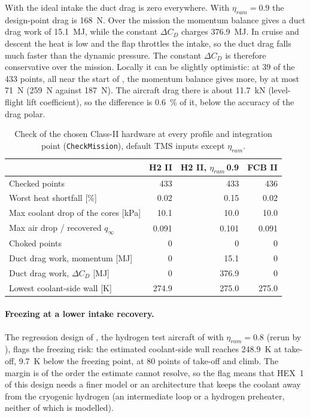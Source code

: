\documentclass[a4paper,11pt]{article}
\begin{document}
With the ideal intake the duct drag is zero everywhere. With $\eta_{ram} = 0.9$ the
design-point drag is \SI{168}{N}. Over the mission the momentum balance gives a duct drag
work of \SI{15.1}{MJ}, while the constant $\Delta C_D$ charges \SI{376.9}{MJ}. In cruise and
descent the heat is low and the flap throttles the intake, so the duct drag falls much faster
than the dynamic pressure. The constant $\Delta C_D$ is therefore conservative over the
mission. Locally it can be slightly optimistic: at 39 of the 433 points, all near the start
of , the momentum balance gives more, by at most \SI{71}{N}
(\SI{259}{N} against \SI{187}{N}). The aircraft drag there is about \SI{11.7}{kN}
(level-flight lift coefficient), so the difference is \SI{0.6}{\%} of it, below the accuracy
of the drag polar.

\begin{table}[htbp]
\centering\small
\caption{Check of the chosen Class-II hardware at every profile and integration point
(\texttt{CheckMission}), default TMS inputs except $\eta_{ram}$.}\label{tab:checks}
\begin{tabular}{@{}lrrr@{}}
\toprule
 & H2 II & H2 II, $\eta_{ram}$\,0.9 & FCB II \\
\midrule
Checked points                        & 433 & 433 & 436 \\
Worst heat shortfall [\%]             & 0.02 & 0.15 & 0.02 \\
Max coolant drop of the cores [kPa]   & 10.1 & 10.0 & 10.0 \\
Max air drop / recovered $q_\infty$   & 0.091 & 0.101 & 0.091 \\
Choked points                         & 0 & 0 & 0 \\
Duct drag work, momentum [MJ]         & 0 & 15.1 & 0 \\
Duct drag work, $\Delta C_D$ [MJ]     & 0 & 376.9 & 0 \\
Lowest coolant-side wall [K]          & 274.9 & 275.0 & 275.0 \\
\bottomrule
\end{tabular}
\end{table}

\paragraph{Freezing at a lower intake recovery.} The regression design of
, the hydrogen test
aircraft of  with $\eta_{ram} = 0.8$ (rerun by
), flags the freezing risk: the estimated coolant-side wall reaches \SI{248.9}{K} at take-off,
\SI{9.7}{K} below the freezing point, at 80 points of take-off and climb. The margin is of
the order the estimate cannot resolve, so the flag means that HEX~1 of this design needs a
finer model or an architecture that keeps the coolant away from the cryogenic hydrogen (an
intermediate loop or a hydrogen preheater, neither of which is modelled).
\end{document}
